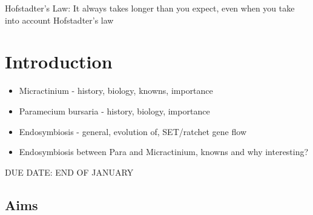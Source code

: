 \graphicspath{{chapters/1.Introduction/figures}}
\begin{savequote}[75mm]
Hofstadter's Law: It always takes longer than you expect, even when you take into account Hofstadter's law
\end{savequote}

\chapter{Introduction}

\begin{itemize}
    \item Micractinium - history, biology, knowns, importance
    \item Paramecium bursaria - history, biology, importance
    \item Endosymbiosis - general, evolution of, SET/ratchet gene flow
    \item Endosymbiosis between Para and Micractinium, knowns and why interesting?
\end{itemize}

DUE DATE: END OF JANUARY

\section{Aims}

